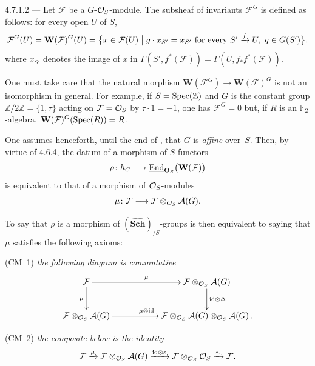 \begin{remark}{4.7.1.2}\label{I.4.7.1.2}
--- {\renewcommand{\thefootnote}{(39)}}
Let \(\mathcal{F}\) be a \(G\)-\(\mathcal{O}_S\)-module. The subsheaf of invariants
\(\mathcal{F}^{G}\) is defined as follows: for every open \(U\) of \(S\),
\[
\mathcal{F}^{G}(U) = \mathbf{W}(\mathcal{F})^{G}(U)
= \bigl\{ x \in \mathcal{F}(U) \bigm|
g \cdot x_{S'} = x_{S'}
\text{ for every } S' \xrightarrow{f} U,\ g \in G(S') \bigr\},
\]
where \(x_{S'}\) denotes the image of \(x\) in
\(\Gamma(S', f^{*}(\mathcal{F})) = \Gamma(U, f_{*}f^{*}(\mathcal{F}))\).

One must take care that the natural morphism
\(\mathbf{W}(\mathcal{F}^{G}) \to \mathbf{W}(\mathcal{F})^{G}\) is not an isomorphism
in general. For example, if \(S = \operatorname{Spec}(\mathbb{Z})\) and \(G\) is the constant group
\(\mathbb{Z}/2\mathbb{Z} = \{1, \tau\}\) acting on \(\mathcal{F} = \mathcal{O}_S\) by
\(\tau \cdot 1 = -1\), one has \(\mathcal{F}^{G} = 0\) but, if \(R\) is an
\(\mathbb{F}_{2}\)-algebra,
\(\mathbf{W}(\mathcal{F})^{G}(\operatorname{Spec}(R)) = R\).
\end{remark}

One assumes henceforth, until the end of , that \(G\) is \emph{affine}
over~\(S\).%
{\renewcommand{\thefootnote}{(40)}}
Then, by virtue of 4.6.4, the datum of a morphism of \(S\)-functors
\[
\rho \colon h_{G} \longrightarrow
\underline{\operatorname{End}}_{\mathbf{O}_{S}}\bigl(\mathbf{W}(\mathcal{F})\bigr)
\]
is equivalent to that of a morphism of \(\mathcal{O}_S\)-modules
\[
\mu \colon \mathcal{F} \longrightarrow
\mathcal{F} \otimes_{\mathcal{O}_S} \mathcal{A}(G).
\]

To say that \(\rho\) is a morphism of
\((\widehat{\mathbf{Sch}})_{/S}\)-groups is then equivalent to saying that
\(\mu\) satisfies the following axioms:

\medskip
\noindent
(CM~1) \emph{the following diagram is commutative}
\[
\xymatrix{
\mathcal{F} \ar[rr]^{\mu} \ar[d]_{\mu}
  && \mathcal{F} \otimes_{\OS} \mathcal{A}(G)
     \ar[d]^{\mathrm{id}\otimes\Delta} \\
\mathcal{F} \otimes_{\OS} \mathcal{A}(G) \ar[rr]^{\mu\otimes\mathrm{id}}
  && \mathcal{F} \otimes_{\OS} \mathcal{A}(G)
     \otimes_{\OS} \mathcal{A}(G)\,.
}
\]

\noindent
(CM~2) \emph{the composite below is the identity}
\[
\mathcal{F} \xrightarrow{\mu}
\mathcal{F} \otimes_{\mathcal{O}_S} \mathcal{A}(G)
\xrightarrow{\mathrm{id}\otimes\varepsilon}
\mathcal{F} \otimes_{\mathcal{O}_S} \mathcal{O}_S
\xrightarrow{\sim}
\mathcal{F}.
\]

